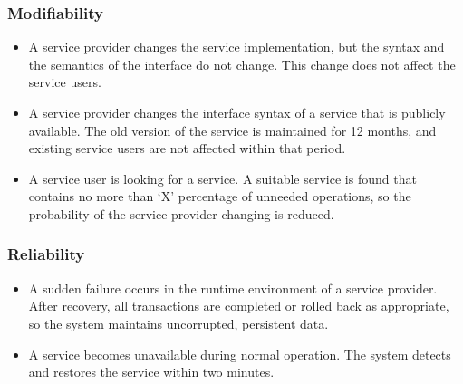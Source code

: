 \subsubsection{Modifiability}
\begin{itemize}
    \item A service provider changes the service implementation, but the syntax and the semantics of the interface do not change. This change does not affect the service users. 
    \item A service provider changes the interface syntax of a service that is publicly available. The old version of the service is maintained for 12 months, and existing service users are not affected within that period.  
    \item A service user is looking for a service. A suitable service is found that contains no more than ‘X’ percentage of unneeded operations, so the probability of the service provider changing is reduced. 
\end{itemize}

\subsubsection{Reliability}
\begin{itemize}
    \item A sudden failure occurs in the runtime environment of a service provider. After recovery, all transactions are completed or rolled back as appropriate, so the system maintains uncorrupted, persistent data. 
    \item A service becomes unavailable during normal operation. The system detects and restores the service within two minutes. 
\end{itemize}

